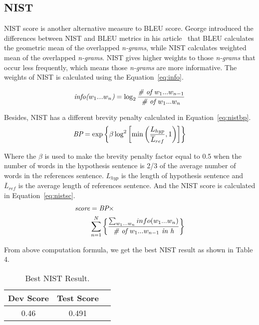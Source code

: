 \documentclass[11pt]{article}
\begin{document}
\subsection{NIST}

NIST score is another alternative measure to BLEU score. George introduced the differences between NIST and BLEU metrics in his article~\cite{HLT:02} that BLEU calculates the geometric mean of the overlapped  \emph{n-grams}, while NIST calculates weighted mean of the overlapped  \emph{n-grams}. NIST gives higher weights to those \emph{n-grams} that occur less frequently, which means those \emph{n-grams} are more informative. The weights of NIST is calculated using the Equation~\ref{eq:info}.

\begin{equation}
\emph{info($w_1$...$w_n$)} = \log_2 {\frac{\textit{\# of }w_1...w_{n-1}}{\textit{\# of }w_1...w_n}}
\label{eq:info}
\end{equation}

Besides, NIST has a different brevity penalty calculated in Equation~\ref{eq:nistbp}. 
\begin{equation}
\emph{BP} = \exp \left\{
 \beta \log^2 \left[
  \min \left(
   \frac{L_{hyp}}{ \overline{L}_{ref} } , 1
  \right)
 \right]
\right\}
\label{eq:nistbp}
\end{equation}

Where the $\beta$ is used to make the brevity penalty factor equal to 0.5 when the number of words in the hypothesis sentence is 2/3 of the average number of words in the references sentence. $L_{hyp}$ is the length of hypothesis sentence and $\overline{L}_{ref}$ is the average length of references sentence. And the NIST score is calculated in Equation~\ref{eq:nistsc}.
\begin{eqnarray}
\begin{aligned}
\emph{score} &= {\emph{BP}} \times \\
& \sum_{n=1}^{N} \left\{ \frac{\sum_{w_1...w_n}info(w_1...w_n)}{\textit{\# of }w_1...w_{n-1} \textit{ in h}} \right\}
\end{aligned}
\label{eq:nistsc}
\end{eqnarray}

From above computation formula, we get the best NIST result as shown in Table 4.
\begin{table}[h]
\begin{center}
 \begin{tabular}{|c|c|c|} 
 \hline
{\bf Dev Score} & {\bf Test Score }\\ [0.5ex]
\hline
0.46 & 0.491 \\
\hline
\end{tabular}
\end{center}
\caption{\label{tab:nist} Best NIST Result. }
\end{table}
\end{document}
